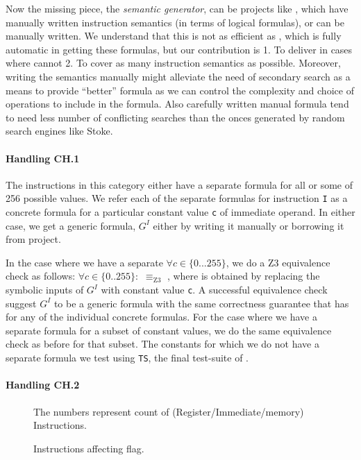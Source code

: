    Now the missing piece, the  \emph{semantic generator}, can be  projects like
   \Stoke, which have manually written instruction semantics (in terms of
       logical formulas), or can be manually written.  We understand that this
   is not as efficient as \Stoke, which is fully automatic in getting these
   formulas, but our contribution is 1. To deliver in cases where \Stoke cannot
   2. To cover  as many instruction semantics as possible. Moreover, writing the
   semantics manually might alleviate the need of secondary search as a means to
   provide ``better'' formula as we can control the complexity and choice of
   operations to include in the formula. Also carefully written manual formula
   tend to need less number of conflicting searches than the onces generated by
   random search engines like Stoke.
   
   \paragraph{Handling CH.1} The instructions in this category either  have a
   separate formula for all or some of 256 possible values. We refer each of the
   separate formulas for instruction {\tt I} as a concrete formula  for
   a particular constant value {\tt c} of immediate operand.  In either case, we get a generic formula, $G^I$ either by
   writing it manually or borrowing it from  \Stoke project.
   
   In the case where
   we have a separate  $\forall c \in \{0...255\}$, we do a Z3
   equivalence check as follows: $\forall c \in \{0..255\}:$  $\equiv_\text{Z3}$
   , where  is obtained by replacing the symbolic inputs of
   $G^I$ with constant value {\tt c}. A successful equivalence check suggest
   $G^I$ to be a generic formula with the same correctness guarantee that
   \Strata has for any of the individual concrete formulas. For the case where
   we have a separate formula for a subset of constant values, we do the same
   equivalence check as before for that subset. The constants for which we do
   not have a separate formula we test  using {\tt TS}, the final
   test-suite of \Strata. 
    
   \paragraph{Handling CH.2}
   \begin{figure}[t]
       \centering
       \caption{Instructions affecting  flag.} The numbers represent count of (Register/Immediate/memory) Instructions. 
       \label{fig:AD}
   \end{figure}

